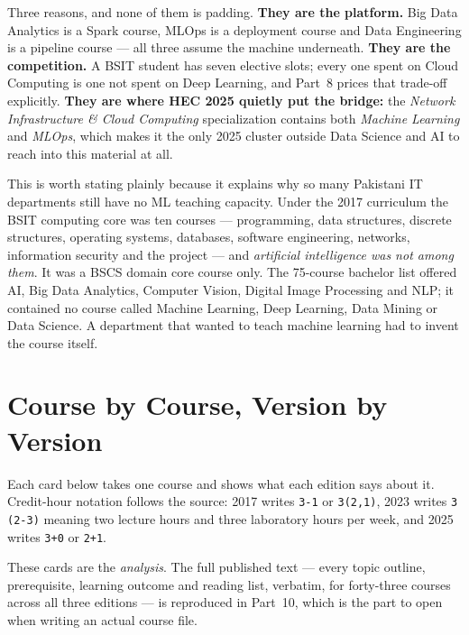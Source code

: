 \documentclass[11pt,a4paper,oneside]{report}
\begin{document}
\begin{finding}
Three reasons, and none of them is padding. \textbf{They are the platform.} Big
Data Analytics is a Spark course, MLOps is a deployment course and Data
Engineering is a pipeline course --- all three assume the machine underneath.
\textbf{They are the competition.} A BSIT student has seven elective slots; every
one spent on Cloud Computing is one not spent on Deep Learning, and Part~8 prices
that trade-off explicitly. \textbf{They are where HEC 2025 quietly put the
bridge:} the \emph{Network Infrastructure \& Cloud Computing} specialization
contains both \emph{Machine Learning} and \emph{MLOps}, which makes it the only
2025 cluster outside Data Science and AI to reach into this material at all.
\end{finding}

\begin{warnbox}
This is worth stating plainly because it explains why so many Pakistani IT
departments still have no ML teaching capacity. Under the 2017 curriculum the
BSIT computing core was ten courses --- programming, data structures, discrete
structures, operating systems, databases, software engineering, networks,
information security and the project --- and \emph{artificial intelligence was
not among them}. It was a BSCS domain core course only. The 75-course bachelor
list offered AI, Big Data Analytics, Computer Vision, Digital Image Processing
and NLP; it contained no course called Machine Learning, Deep Learning, Data
Mining or Data Science. A department that wanted to teach machine learning had
to invent the course itself.
\end{warnbox}

\section{Course by Course, Version by Version}

Each card below takes one course and shows what each edition says about it.
Credit-hour notation follows the source: 2017 writes \texttt{3-1} or
\texttt{3(2,1)}, 2023 writes \texttt{3 (2-3)} meaning two lecture hours and three
laboratory hours per week, and 2025 writes \texttt{3+0} or \texttt{2+1}.

These cards are the \emph{analysis}. The full published text --- every topic
outline, prerequisite, learning outcome and reading list, verbatim, for
forty-three courses across all three editions --- is reproduced in Part~10,
which is the part to open when writing an actual course file.
\end{document}
